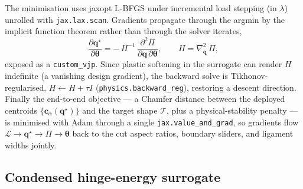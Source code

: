 \documentclass[pdflatex,sn-mathphys-num]{sn-jnl}%
\theoremstyle{thmstyleone}%
\theoremstyle{thmstyletwo}%
\theoremstyle{thmstylethree}%
\begin{document}
The minimisation uses jaxopt L-BFGS under incremental load stepping (in $\lambda$)
unrolled with \texttt{jax.lax.scan}. Gradients propagate through the argmin by the
implicit function theorem rather than through the solver iterates,
\begin{equation}
  \frac{\partial \bm{q}^\star}{\partial \bm{\theta}}
    = -\,H^{-1}\,\frac{\partial^2 \Pi}{\partial \bm{q}\,\partial \bm{\theta}},
  \qquad
  H = \nabla^2_{\bm{q}}\,\Pi,
\end{equation}
exposed as a \texttt{custom\_vjp}. Since plastic softening in the surrogate can
render $H$ indefinite (a vanishing design gradient), the backward solve is
Tikhonov-regularised, $H\!\leftarrow\!H+\tau I$
(\texttt{physics.backward\_reg}), restoring a descent direction. Finally the
end-to-end objective --- a Chamfer distance between the deployed centroids
$\{\bm{c}_\alpha(\bm{q}^\star)\}$ and the target shape $\mathcal{T}$, plus a
physical-stability penalty --- is minimised with Adam through a single
\texttt{jax.value\_and\_grad}, so gradients flow
$\mathcal{L}\!\to\!\bm{q}^\star\!\to\!\Pi\!\to\!\bm{\theta}$ back to the cut
aspect ratios, boundary sliders, and ligament widths jointly.

\subsection{Condensed hinge-energy surrogate}

\end{document}
